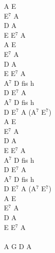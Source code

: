 \documentclass[a5paper, 10pt]{book}
\begin{document}
\begin{minipage}[t]{0.2\textwidth}
A E\\E$^7$ A\\D A\\E E$^7$ A\\

A E\\E$^7$ A\\D A\\E E$^7$ A\\

A$^7$ D fis h\\D E$^7$ A\\A$^7$ D fis h\\D E$^7$ A (A$^7$ E$^7$)\\

A E\\E$^7$ A\\D A\\E E$^7$ A\\

A$^7$ D fis h\\D E$^7$ A\\A$^7$ D fis h\\D E$^7$ A (A$^7$ E$^7$)\\

A E\\E$^7$ A\\D A\\E E$^7$ A\\

~\\
A G D A\\

\end{minipage}

\newpage
\end{document}

